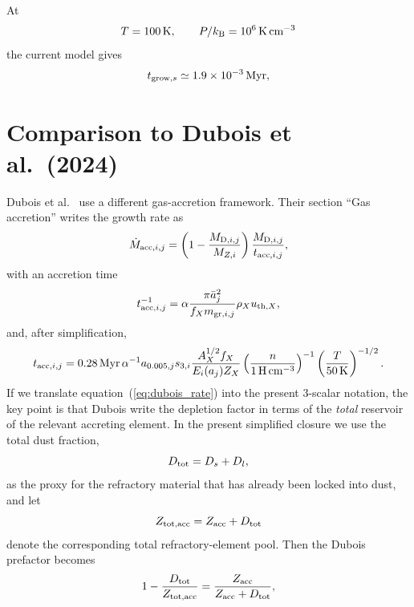 \documentclass[11pt]{article}
\begin{document}
At
\begin{equation*}
T=100\,{\rm K},\qquad P/k_{\rm B}=10^6\,{\rm K\,cm^{-3}}
\end{equation*}
the current model gives
\begin{equation}
t_{{\rm grow},s} \simeq 1.9\times10^{-3}\,{\rm Myr},
\end{equation}

\section{Comparison to Dubois et al.\ (2024)}

Dubois et al.\ \cite{Dubois2024} use a different gas-accretion framework. Their section ``Gas accretion'' writes the growth rate as
\begin{equation}
\dot{M}_{{\rm acc},i,j}
= \left(1-\frac{M_{{\rm D},i,j}}{M_{Z,i}}\right)
\frac{M_{{\rm D},i,j}}{t_{{\rm acc},i,j}},
\label{eq:dubois_rate}
\end{equation}
with an accretion time
\begin{equation}
t_{{\rm acc},i,j}^{-1}
= \alpha
\frac{\pi \bar{a}_j^2}{f_X m_{{\rm gr},i,j}}
\rho_X u_{{\rm th},X},
\label{eq:dubois_tacc_inverse}
\end{equation}
and, after simplification,
\begin{equation}
t_{{\rm acc},i,j}
= 0.28\,{\rm Myr}\,
\alpha^{-1}
a_{0.005,j}
s_{3,i}
\frac{A_X^{1/2}f_X}{E_i(a_j)Z_X}
\left(\frac{n}{1\,{\rm H\,cm^{-3}}}\right)^{-1}
\left(\frac{T}{50\,{\rm K}}\right)^{-1/2}.
\label{eq:dubois_tacc}
\end{equation}
If we translate equation~(\ref{eq:dubois_rate}) into the present 3-scalar notation, the key point is that Dubois write the depletion factor in terms of the \emph{total} reservoir of the relevant accreting element. In the present simplified closure we use the total dust fraction,
\begin{equation}
D_{\rm tot}=D_s+D_l,
\label{eq:dtot}
\end{equation}
as the proxy for the refractory material that has already been locked into dust, and let
\begin{equation}
Z_{{\rm tot},\rm acc}=Z_{\rm acc}+D_{\rm tot}
\label{eq:ztotacc}
\end{equation}
denote the corresponding total refractory-element pool. Then the Dubois prefactor becomes
\begin{equation}
1-\frac{D_{\rm tot}}{Z_{{\rm tot},\rm acc}}
=\frac{Z_{\rm acc}}{Z_{\rm acc}+D_{\rm tot}},
\label{eq:dubois_prefactor_proxy}
\end{equation}
\end{document}

